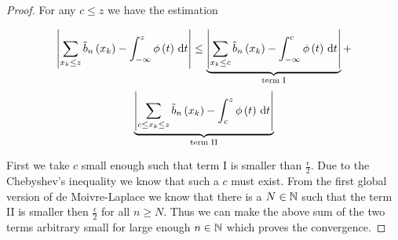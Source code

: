 \begin{proof}
  For any $c \le z$ we have the estimation

  \begin{multline}
    \abs{\sum_{\x \le z} \bb{\x} - \int_{-\infty}^z \fphi{t}\d{t} } \le
    \underbrace{\abs{\sum_{\x \le c} \bb{\x} - \int_{-\infty}^c \fphi{t}\d{t} }}_\text{term I} + \nl \underbrace{\abs{\sum_{c\le \x \le z} \bb{\x} - \int_c^z \fphi{t}\d{t} }}_\text{term II}
  \end{multline}

  First we take $c$ small enough such that term I is smaller than $\frac \epsilon 2$. Due to the Chebyshev's inequality \cite{wiki:chebyshev} we know that such a $c$ must exist. From the first global version of de Moivre-Laplace we know that there is a $N \in\mathbb N$ such that the term II is smaller then $\frac \epsilon 2$ for all $n\ge N$. Thus we can make the above sum of the two terms arbitrary small for large enough $n\in\mathbb N$ which proves the convergence.
\end{proof}
